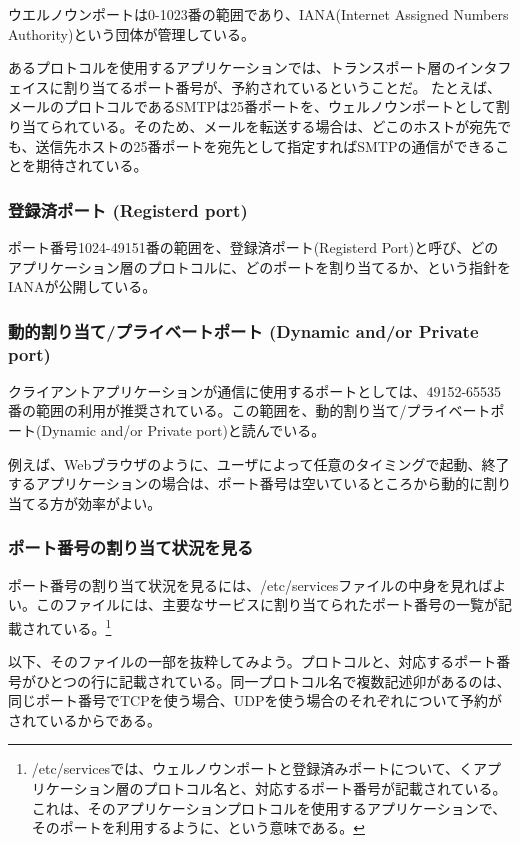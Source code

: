 ウエルノウンポートは0-1023番の範囲であり、IANA(Internet Assigned Numbers Authority)という団体が管理している。

あるプロトコルを使用するアプリケーションでは、トランスポート層のインタフェイスに割り当てるポート番号が、予約されているということだ。
たとえば、メールのプロトコルであるSMTPは25番ポートを、ウェルノウンポートとして割り当てられている。そのため、メールを転送する場合は、どこのホストが宛先でも、送信先ホストの25番ポートを宛先として指定すればSMTPの通信ができることを期待されている。


\subsubsection{登録済ポート (Registerd port)}

ポート番号1024-49151番の範囲を、登録済ポート(Registerd Port)と呼び、どのアプリケーション層のプロトコルに、どのポートを割り当てるか、という指針をIANAが公開している。

\subsubsection{動的割り当て/プライベートポート (Dynamic and/or Private port)}

クライアントアプリケーションが通信に使用するポートとしては、49152-65535番の範囲の利用が推奨されている。この範囲を、動的割り当て/プライベートポート(Dynamic and/or Private port)と読んでいる。

例えば、Webブラウザのように、ユーザによって任意のタイミングで起動、終了するアプリケーションの場合は、ポート番号は空いているところから動的に割り当てる方が効率がよい。

\subsubsection{ポート番号の割り当て状況を見る}

ポート番号の割り当て状況を見るには、/etc/servicesファイルの中身を見ればよい。このファイルには、主要なサービスに割り当てられたポート番号の一覧が記載されている。\footnote{/etc/servicesでは、ウェルノウンポートと登録済みポートについて、くアプリケーション層のプロトコル名と、対応するポート番号が記載されている。これは、そのアプリケーションプロトコルを使用するアプリケーションで、そのポートを利用するように、という意味である。}

以下、そのファイルの一部を抜粋してみよう。プロトコルと、対応するポート番号がひとつの行に記載されている。同一プロトコル名で複数記述卯があるのは、同じポート番号でTCPを使う場合、UDPを使う場合のそれぞれについて予約がされているからである。

